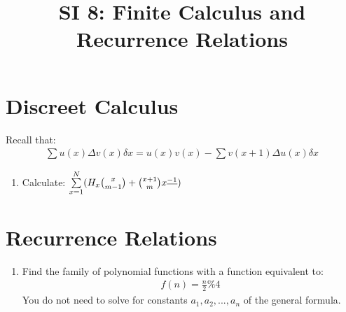 \documentclass[12pt]{article}
\date{}
\author{}
\title{SI 8: Finite Calculus and Recurrence Relations}
\begin{document}
	\maketitle
	\section{Discreet Calculus}
	Recall that:
	\begin{align*}
	\sum u(x)\Delta v(x) \delta x = u(x)v(x) - \sum v(x+1)\Delta u(x)\delta x
	\end{align*}
	
	\begin{enumerate}
		\item Calculate: $\sum^N_{x=1}\limits(H_x {x\choose{m-1}}+{{x+1}\choose m}x^{\underline{-1}})$
	\end{enumerate}

	\section{Recurrence Relations}
	\begin{enumerate}[resume]
		\item Find the family of polynomial functions with a function equivalent to:
		\begin{align*}
		f(n) = \frac{n}{2} \% 4
		\end{align*} 
		You do not need to solve for constants $a_1, a_2,...,a_n$ of the general formula.
	\end{enumerate}
\end{document}
